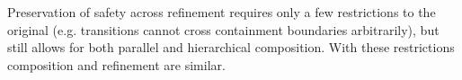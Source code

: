 Preservation of safety across refinement requires only a few restrictions to the original\cite{Harel} \SCs (e.g. transitions cannot cross containment boundaries arbitrarily), but still allows for both parallel and hierarchical composition.  With these restrictions composition and refinement are similar.







